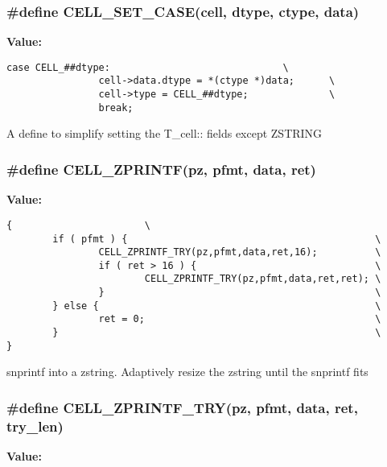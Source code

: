 \subsubsection{\setlength{\rightskip}{0pt plus 5cm}\#define CELL\_\-SET\_\-CASE(cell, dtype, ctype, data)}\label{group__table__cell_a7}


{\bf Value:}

\footnotesize\begin{verbatim}case CELL_##dtype:                              \
                cell->data.dtype = *(ctype *)data;      \
                cell->type = CELL_##dtype;              \
                break;\end{verbatim}\normalsize 
A define to simplify setting the T\_\-cell:: fields except ZSTRING 
\subsubsection{\setlength{\rightskip}{0pt plus 5cm}\#define CELL\_\-ZPRINTF(pz, pfmt, data, ret)}\label{group__table__cell_a9}


{\bf Value:}

\footnotesize\begin{verbatim}{                       \
        if ( pfmt ) {                                           \
                CELL_ZPRINTF_TRY(pz,pfmt,data,ret,16);          \
                if ( ret > 16 ) {                               \
                        CELL_ZPRINTF_TRY(pz,pfmt,data,ret,ret); \
                }                                               \
        } else {                                                \
                ret = 0;                                        \
        }                                                       \
}\end{verbatim}\normalsize 
snprintf into a zstring. Adaptively resize the zstring until the snprintf fits 
\subsubsection{\setlength{\rightskip}{0pt plus 5cm}\#define CELL\_\-ZPRINTF\_\-TRY(pz, pfmt, data, ret, try\_\-len)}\label{group__table__cell_a8}


{\bf Value:}

